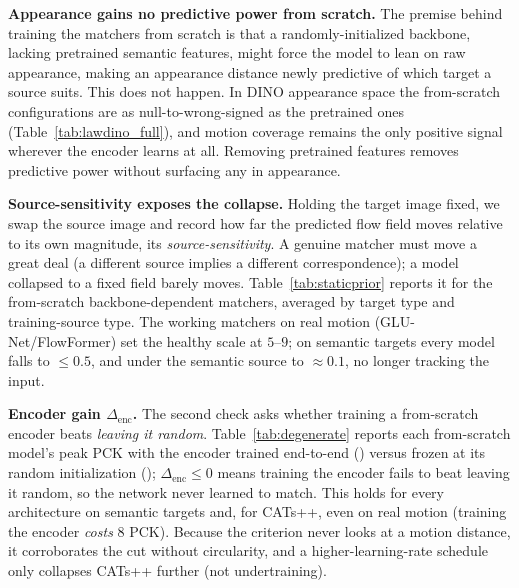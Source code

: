 \documentclass[runningheads]{llncs}
\newcommand{\pck}{PCK}
\newcommand{\enctrained}{\textcolor{orange!90!red}{\faFire}}
\newcommand{\encfrozen}{\textcolor{cyan!55!blue}{\faSnowflake[regular]}}
\begin{document}
\noindent\textbf{Appearance gains no predictive power from scratch.} The premise
behind training the matchers from scratch is that a randomly-initialized backbone,
lacking pretrained semantic features, might force the model to lean on raw
appearance, making an appearance distance newly predictive of which
target a source suits. This does not happen. In DINO appearance space the from-scratch
configurations are as null-to-wrong-signed as the pretrained ones
(Table~\ref{tab:lawdino_full}), and motion coverage remains the only positive
signal wherever the encoder learns at all. Removing pretrained features removes
predictive power without surfacing any in appearance.

\noindent\textbf{Source-sensitivity exposes the collapse.} Holding the target
image fixed, we swap the source image and record how far the predicted flow field
moves relative to its own magnitude, its \emph{source-sensitivity}. A genuine
matcher must move a great deal (a different source implies a different
correspondence); a model collapsed to a fixed field barely moves.
Table~\ref{tab:staticprior} reports it for the from-scratch backbone-dependent
matchers, averaged by target type and training-source type. The working matchers
on real motion (GLU-Net/FlowFormer) set the healthy scale at $5$--$9$; on semantic
targets every model falls to $\le0.5$, and under the semantic source to
${\approx}0.1$, no longer tracking the input.

\begin{table}[h]
\centering
\caption{\textbf{Source-sensitivity exposes the static-prior collapse} of
from-scratch training. Distance a from-scratch model's predicted flow
moves when the source image is swapped (target fixed), relative to its magnitude:
large $=$ a working matcher, $\to0$ $=$ a static prior that ignores the input.
\colorbox{green!16}{Green}: working ($5$--$9$ for GLU-Net/FlowFormer, \textbf{bold});
\colorbox{gray!15}{Gray}: collapsed ($\le0.5$). $^{\dagger}$CATs++ from scratch
still responds on real motion but transfers below random features
($\Delta_{\text{enc}}<0$, Table~\ref{tab:degenerate}).}
\label{tab:staticprior}
\footnotesize
\renewcommand{\arraystretch}{0.95}
\setlength{\tabcolsep}{5pt}

\end{table}

\noindent\textbf{Encoder gain $\Delta_{\text{enc}}$.} The second check asks
whether training a from-scratch encoder beats \emph{leaving it random}.
Table~\ref{tab:degenerate} reports each from-scratch model's peak \pck{} with the
encoder trained end-to-end (\enctrained) versus frozen at its random
initialization (\encfrozen); $\Delta_{\text{enc}}{\le}0$ means training the
encoder fails to beat leaving it random, so the network never learned to match. This
holds for every architecture on semantic targets and, for CATs++, even on
real motion (training the encoder \emph{costs} $8$ \pck). Because the criterion
never looks at a motion distance, it corroborates the cut without circularity, and
a higher-learning-rate schedule only collapses CATs++ further (not undertraining).
\end{document}
